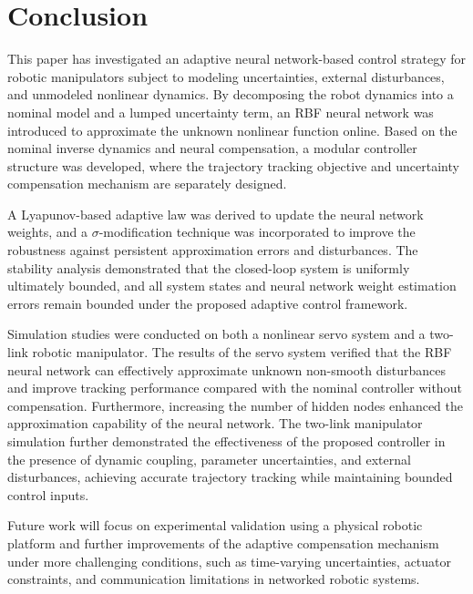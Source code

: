 \section{Conclusion}

This paper has investigated an adaptive neural network-based control
strategy for robotic manipulators subject to modeling uncertainties,
external disturbances, and unmodeled nonlinear dynamics. By decomposing
the robot dynamics into a nominal model and a lumped uncertainty term, an
RBF neural network was introduced to approximate the unknown nonlinear
function online. Based on the nominal inverse dynamics and neural
compensation, a modular controller structure was developed, where the
trajectory tracking objective and uncertainty compensation mechanism are
separately designed.

A Lyapunov-based adaptive law was derived to update the neural network
weights, and a $\sigma$-modification technique was incorporated to improve
the robustness against persistent approximation errors and disturbances.
The stability analysis demonstrated that the closed-loop system is
uniformly ultimately bounded, and all system states and neural network
weight estimation errors remain bounded under the proposed adaptive
control framework.

Simulation studies were conducted on both a nonlinear servo system and a
two-link robotic manipulator. The results of the servo system verified
that the RBF neural network can effectively approximate unknown
non-smooth disturbances and improve tracking performance compared with the
nominal controller without compensation. Furthermore, increasing the
number of hidden nodes enhanced the approximation capability of the neural
network. The two-link manipulator simulation further demonstrated the
effectiveness of the proposed controller in the presence of dynamic
coupling, parameter uncertainties, and external disturbances, achieving
accurate trajectory tracking while maintaining bounded control inputs.

Future work will focus on experimental validation using a physical robotic
platform and further improvements of the adaptive compensation mechanism
under more challenging conditions, such as time-varying uncertainties,
actuator constraints, and communication limitations in networked robotic
systems.

